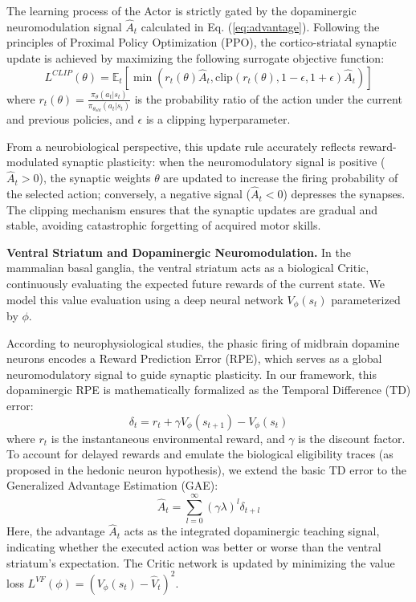 \documentclass[lettersize,journal]{IEEEtran}
\begin{document}
The learning process of the Actor is strictly gated by the dopaminergic neuromodulation signal $\hat{A}_t$ calculated in Eq. (\ref{eq:advantage}). 
Following the principles of Proximal Policy Optimization (PPO), the cortico-striatal synaptic update is achieved by maximizing the following surrogate objective function:
\begin{equation}
    L^{CLIP}(\theta) = \mathbb{E}_t \left[ \min(r_t(\theta)\hat{A}_t, \text{clip}(r_t(\theta), 1-\epsilon, 1+\epsilon)\hat{A}_t) \right]
\end{equation}
where $r_t(\theta) = \frac{\pi_\theta(a_t|s_t)}{\pi_{\theta_{old}}(a_t|s_t)}$ is the probability ratio of the action under the current and previous policies, and $\epsilon$ is a clipping hyperparameter. 

From a neurobiological perspective, this update rule accurately reflects reward-modulated synaptic plasticity: when the neuromodulatory signal is positive ($\hat{A}_t > 0$), the synaptic weights $\theta$ are updated to increase the firing probability of the selected action; conversely, a negative signal ($\hat{A}_t < 0$) depresses the synapses. 
The clipping mechanism ensures that the synaptic updates are gradual and stable, avoiding catastrophic forgetting of acquired motor skills.

\textbf{Ventral Striatum and Dopaminergic Neuromodulation.}
In the mammalian basal ganglia, the ventral striatum acts as a biological Critic, continuously evaluating the expected future rewards of the current state. 
We model this value evaluation using a deep neural network $V_\phi(s_t)$ parameterized by $\phi$. 

According to neurophysiological studies, the phasic firing of midbrain dopamine neurons encodes a Reward Prediction Error (RPE), which serves as a global neuromodulatory signal to guide synaptic plasticity. 
In our framework, this dopaminergic RPE is mathematically formalized as the Temporal Difference (TD) error:
\begin{equation}
    \delta_t = r_t + \gamma V_\phi(s_{t+1}) - V_\phi(s_t)
\end{equation}
where $r_t$ is the instantaneous environmental reward, and $\gamma$ is the discount factor. 
To account for delayed rewards and emulate the biological eligibility traces (as proposed in the hedonic neuron hypothesis), we extend the basic TD error to the Generalized Advantage Estimation (GAE):
\begin{equation} \label{eq:advantage}
    \hat{A}_t = \sum_{l=0}^{\infty} (\gamma \lambda)^l \delta_{t+l}
\end{equation}
Here, the advantage $\hat{A}_t$ acts as the integrated dopaminergic teaching signal, indicating whether the executed action was better or worse than the ventral striatum's expectation. 
The Critic network is updated by minimizing the value loss $L^{VF}(\phi) = (V_\phi(s_t) - \hat{V}_t)^2$.
\end{document}
